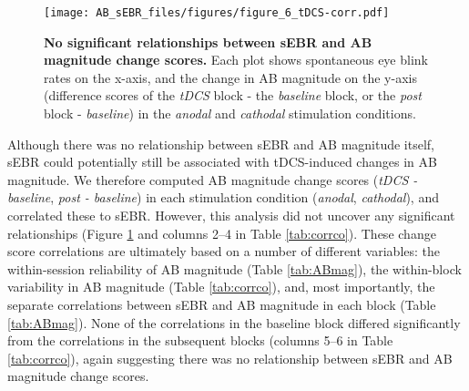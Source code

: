 \documentclass[11pt,]{memoir}
\begin{document}
\begin{figure}
\centering
\texttt{[image: AB\_sEBR\_files/figures/figure\_6\_tDCS-corr.pdf]}
\caption{\label{fig:fig-tDCS-corr}\textbf{No significant relationships between sEBR and AB magnitude change scores.} Each plot shows spontaneous eye blink rates on the x-axis, and the change in AB magnitude on the y-axis (difference scores of the \emph{tDCS} block - the \emph{baseline} block, or the \emph{post} block - \emph{baseline}) in the \emph{anodal} and \emph{cathodal} stimulation conditions.}
\end{figure}



Although there was no relationship between sEBR and AB magnitude itself, sEBR could potentially still be associated with tDCS-induced changes in AB magnitude. We therefore computed AB magnitude change scores (\emph{tDCS - baseline}, \emph{post - baseline}) in each stimulation condition (\emph{anodal}, \emph{cathodal}), and correlated these to sEBR. However, this analysis did not uncover any significant relationships (Figure \ref{fig:fig-tDCS-corr} and columns 2--4 in Table \ref{tab:corrco}). These change score correlations are ultimately based on a number of different variables: the within-session reliability of AB magnitude (Table \ref{tab:ABmag}), the within-block variability in AB magnitude (Table \ref{tab:corrco}), and, most importantly, the separate correlations between sEBR and AB magnitude in each block (Table \ref{tab:ABmag}). None of the correlations in the baseline block differed significantly from the correlations in the subsequent blocks (columns 5--6 in Table \ref{tab:corrco}), again suggesting there was no relationship between sEBR and AB magnitude change scores.
\end{document}
